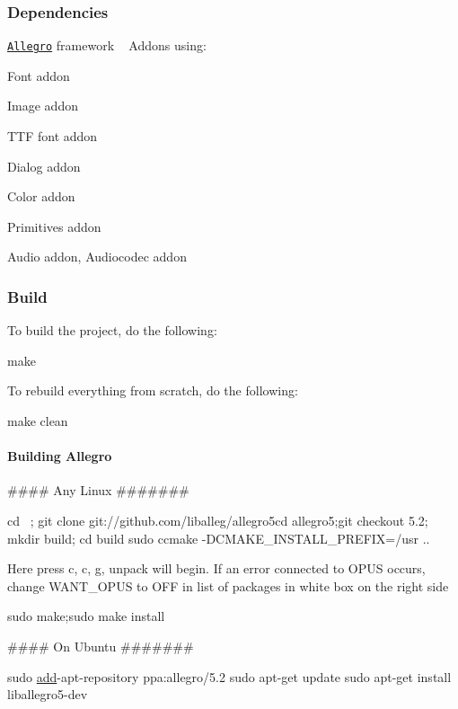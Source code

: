 \subsubsection*{Dependencies}


\begin{DoxyItemize}
\item \href{http://liballeg.org/}{\tt Allegro} framework ~\newline
Addons using\+:
\begin{DoxyItemize}
\item Font addon
\item Image addon
\item T\+TF font addon
\item Dialog addon
\item Color addon
\item Primitives addon
\item Audio addon, Audiocodec addon
\end{DoxyItemize}
\end{DoxyItemize}

\subsubsection*{Build}

To build the project, do the following\+: 
\begin{DoxyCode}
make
\end{DoxyCode}
 To rebuild everything from scratch, do the following\+: 
\begin{DoxyCode}
make clean
\end{DoxyCode}
 \paragraph*{Building Allegro}

\#\#\#\# Any Linux \#\#\#\#\#\#\# 
\begin{DoxyCode}
cd ~; git clone git:\textcolor{comment}{//github.com/liballeg/allegro5cd allegro5;git checkout 5.2; mkdir build; cd build}
sudo ccmake -DCMAKE\_INSTALL\_PREFIX=/usr ..
\end{DoxyCode}
 Here press \textquotesingle{}c\textquotesingle{}, \textquotesingle{}c\textquotesingle{}, \textquotesingle{}g\textquotesingle{}, unpack will begin. If an error connected to O\+P\+US occurs, change W\+A\+N\+T\+\_\+\+O\+P\+US to \textquotesingle{}O\+FF\textquotesingle{} in list of packages in white box on the right side 
\begin{DoxyCode}
sudo make;sudo make install
\end{DoxyCode}
 \#\#\#\# On Ubuntu \#\#\#\#\#\#\# 
\begin{DoxyCode}
sudo \hyperlink{_array_8c_adbf671d7cacada1d81888bbf30af0896}{add}-apt-repository ppa:allegro/5.2
sudo apt-\textcolor{keyword}{get} update
sudo apt-\textcolor{keyword}{get} install liballegro5-dev
\end{DoxyCode}
